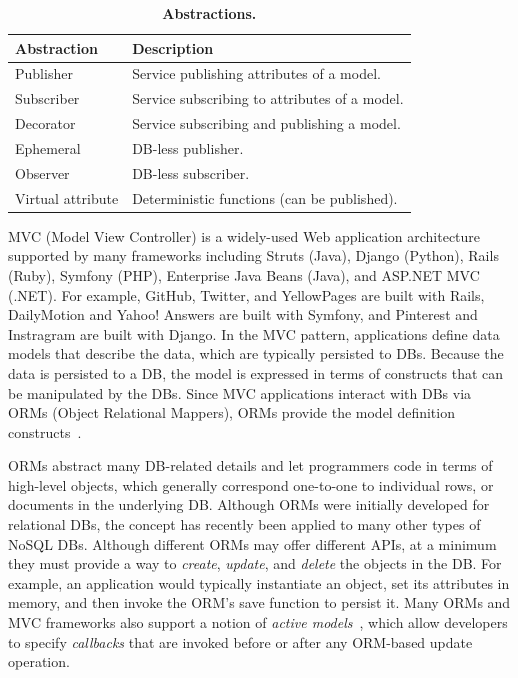 \begin{table}[t]
 \centering
 \begin{tabular}{l l}
\toprule {\bf Abstraction} & {\bf Description}                             \\ \midrule
Publisher                  & Service publishing attributes of a model.     \\
Subscriber                 & Service subscribing to attributes of a model. \\
Decorator                  & Service subscribing and publishing a model.   \\
Ephemeral                  & DB-less publisher.                            \\
Observer                   & DB-less subscriber.                           \\
Virtual attribute          & Deterministic functions (can be published).   \\
\bottomrule
 \end{tabular}
 \caption{{\bf \synapse Abstractions.}}
 \label{synapse:tab:abstractions}
\end{table}



MVC (Model View Controller) is a widely-used Web application architecture supported by many frameworks including Struts (Java), Django (Python), Rails (Ruby),
Symfony (PHP), Enterprise Java Beans (Java), and ASP.NET MVC (.NET).
For example, GitHub, Twitter, and YellowPages are built with Rails,
DailyMotion and Yahoo! Answers are built with Symfony, and Pinterest
and Instragram are built with Django.
In the MVC pattern, applications define data models that describe the 
data, which are typically
persisted to DBs.  Because the data is persisted to a DB, the 
model is expressed in terms of constructs that can be manipulated by
the DBs.  Since MVC applications interact with DBs via ORMs (Object Relational Mappers), ORMs
provide the model definition constructs~\cite{Barcia:2008aa}.

ORMs abstract many DB-related
details and let programmers code in terms of high-level objects, which
generally correspond one-to-one to individual rows, or documents
in the underlying DB.  Although
ORMs were initially developed for relational DBs, the concept has recently
been applied to many other types of NoSQL DBs.  
Although different ORMs may offer different APIs, at a minimum they must
provide a way to {\em create}, {\em update}, and {\em delete} the objects in
the DB.  For example, an application would typically instantiate an
object, set its attributes in memory, and then invoke the ORM's save
function to persist it.  Many ORMs and MVC frameworks also support a notion of 
{\em active models}~\cite{Fowler:2002:PEA:579257}, which allow
developers to specify {\em callbacks} that are invoked before or after
any ORM-based update operation.  

